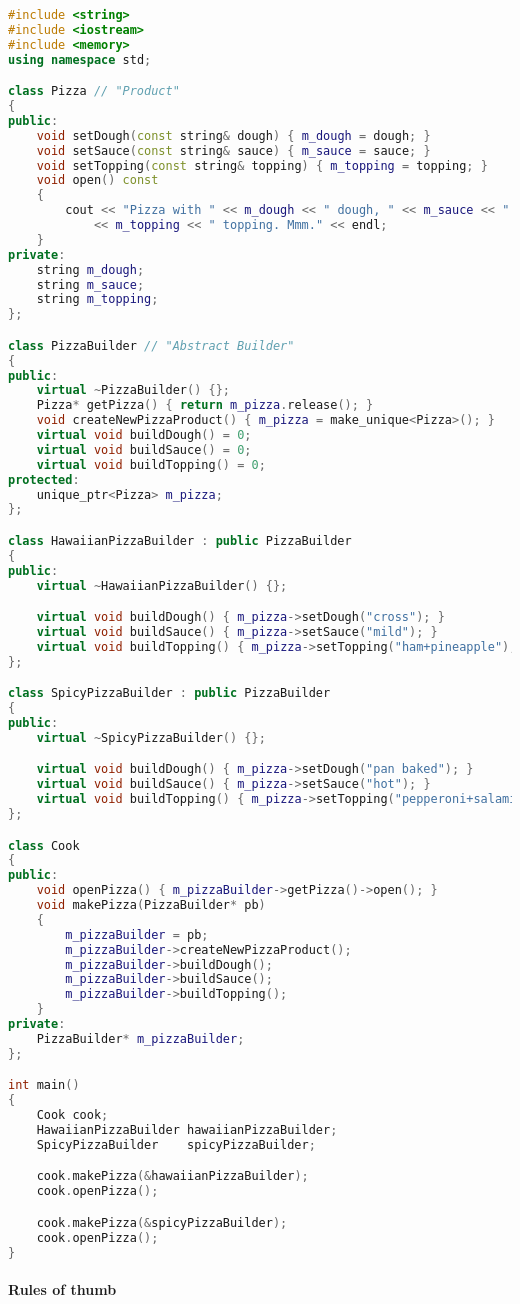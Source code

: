 \documentclass{book}
\begin{document}
\begin{lstlisting}[caption={Builder Patterns sample code 1}, language=C++]
#include <string>
#include <iostream>
#include <memory>
using namespace std;

class Pizza // "Product"
{
public:
	void setDough(const string& dough) { m_dough = dough; }
	void setSauce(const string& sauce) { m_sauce = sauce; }
	void setTopping(const string& topping) { m_topping = topping; }
	void open() const
	{
		cout << "Pizza with " << m_dough << " dough, " << m_sauce << " sauce and "
			<< m_topping << " topping. Mmm." << endl;
	}
private:
	string m_dough;
	string m_sauce;
	string m_topping;
};

class PizzaBuilder // "Abstract Builder"
{
public:
	virtual ~PizzaBuilder() {};
	Pizza* getPizza() { return m_pizza.release(); }
	void createNewPizzaProduct() { m_pizza = make_unique<Pizza>(); }
	virtual void buildDough() = 0;
	virtual void buildSauce() = 0;
	virtual void buildTopping() = 0;
protected:
	unique_ptr<Pizza> m_pizza;
};

class HawaiianPizzaBuilder : public PizzaBuilder
{
public:
	virtual ~HawaiianPizzaBuilder() {};

	virtual void buildDough() { m_pizza->setDough("cross"); }
	virtual void buildSauce() { m_pizza->setSauce("mild"); }
	virtual void buildTopping() { m_pizza->setTopping("ham+pineapple"); }
};

class SpicyPizzaBuilder : public PizzaBuilder
{
public:
	virtual ~SpicyPizzaBuilder() {};

	virtual void buildDough() { m_pizza->setDough("pan baked"); }
	virtual void buildSauce() { m_pizza->setSauce("hot"); }
	virtual void buildTopping() { m_pizza->setTopping("pepperoni+salami"); }
};

class Cook
{
public:
	void openPizza() { m_pizzaBuilder->getPizza()->open(); }
	void makePizza(PizzaBuilder* pb)
	{
		m_pizzaBuilder = pb;
		m_pizzaBuilder->createNewPizzaProduct();
		m_pizzaBuilder->buildDough();
		m_pizzaBuilder->buildSauce();
		m_pizzaBuilder->buildTopping();
	}
private:
	PizzaBuilder* m_pizzaBuilder;
};

int main()
{
	Cook cook;
	HawaiianPizzaBuilder hawaiianPizzaBuilder;
	SpicyPizzaBuilder    spicyPizzaBuilder;

	cook.makePizza(&hawaiianPizzaBuilder);
	cook.openPizza();

	cook.makePizza(&spicyPizzaBuilder);
	cook.openPizza();
}
\end{lstlisting}
\paragraph{Rules of thumb}
\end{document}
